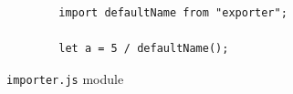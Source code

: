 \vspace{2em}
\begin{figure}[!htb]
	\centering
	\begin{minipage}{25em}
		\begin{verbatim}
		import defaultName from "exporter";

		let a = 5 / defaultName();
		\end{verbatim}
	\end{minipage}
  \caption{\texttt{importer.js} module}
  \label{fig:running-example-importer}
\end{figure}


